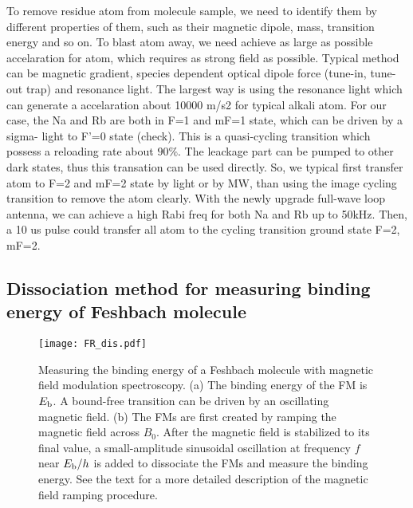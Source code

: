 To remove residue atom from molecule sample, we need to identify them by different properties of them, such as their magnetic dipole, mass, transition energy and so on. To blast atom away, we need achieve as large as possible accelaration for atom, which requires as strong field as possible. Typical method can be magnetic gradient, species dependent optical dipole force (tune-in, tune-out trap) and resonance light. The largest way is using the resonance light which can generate a accelaration about 10000 m/s2 for typical alkali atom. For our case, the Na and Rb are both in F=1 and mF=1 state, which can be driven by a sigma- light to F'=0 state (check). This is a quasi-cycling transition which possess a reloading rate about \(90\%\). The leackage part can be pumped to other dark states, thus this transation can be used directly. So, we typical first transfer atom to F=2 and mF=2 state by light or by MW, than using the image cycling transition to remove the atom clearly. %
With the newly upgrade full-wave loop antenna, we can achieve a high Rabi freq for both Na and Rb up to 50kHz. Then, a 10 us pulse could transfer all atom to the cycling transition ground state F=2, mF=2.  

\subsection{Dissociation method for measuring binding energy of Feshbach molecule}


\begin{figure}[hb]
\begin{center}
\texttt{[image: FR\_dis.pdf]}
\end{center}
\caption[Time sequence for measuring binding energy of Feshbach molecules]{Measuring the binding energy of a Feshbach molecule with magnetic field modulation spectroscopy. (a) The binding energy of the FM is $E_{\rm b}$. A bound-free transition can be driven by an oscillating magnetic field. (b) The FMs are first created by ramping the magnetic field across $B_0$. After the magnetic field is stabilized to its final value, a small-amplitude sinusoidal oscillation at frequency $f$ near $E_{\rm b}/h$ is added to dissociate the FMs and measure the binding energy. See the text for a more detailed description of the magnetic field ramping procedure.}
\label{FR_dis}
\end{figure}


